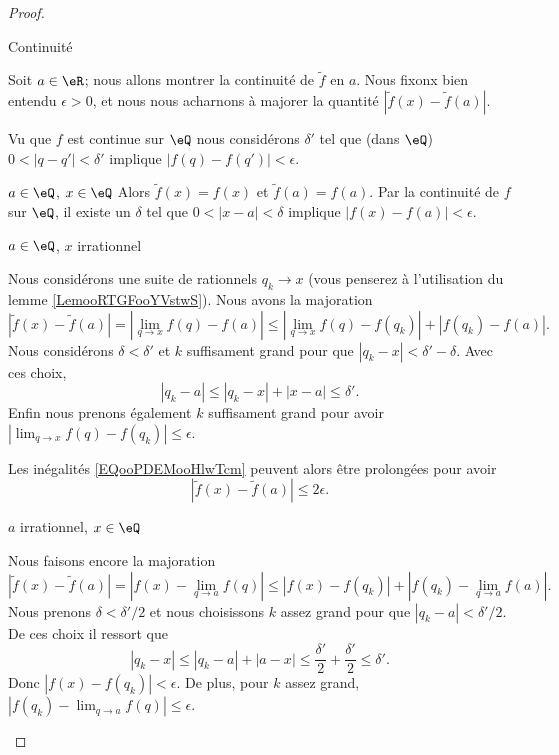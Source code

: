 \begin{proof}
\begin{subproof}
		\item[Continuité]

		Soit \( a\in \eR\); nous allons montrer la continuité de \( \tilde f\) en \( a\). Nous fixonx bien entendu \( \epsilon>0\), et nous nous acharnons à majorer la quantité \( | \tilde f(x)-\tilde f(a) |\).

		Vu que \( f\) est continue sur \( \eQ\) nous considérons \( \delta'\) tel que (dans \( \eQ\)) \( 0<| q-q' |<\delta'\) implique \( | f(q)-f(q') |<\epsilon\).

		\begin{subproof}
			\item[\( a\in \eQ\), \( x\in \eQ\)]
			Alors \( \tilde f(x)=f(x)\) et \( \tilde f(a)=f(a)\). Par la continuité de \( f\) sur \( \eQ\), il existe un \( \delta\) tel que \( 0<| x-a |<\delta\) implique \( | f(x)-f(a) |<\epsilon\).

			\item[\( a\in \eQ\), \( x\) irrationnel]

			Nous considérons une suite de rationnels \( q_k\to x\) (vous penserez à l'utilisation du lemme \ref{LemooRTGFooYVstwS}). Nous avons la majoration
			\begin{equation}        \label{EQooPDEMooHlwTcm}
				| \tilde f(x)-\tilde f(a) |=| \lim_{q\to x} f(q)-f(a) |\leq | \lim_{q\to x} f(q)-f(q_k) |+| f(q_k)-f(a) |.
			\end{equation}
			Nous considérons \( \delta<\delta'\) et \( k\) suffisament grand pour que \( | q_k-x |<\delta'-\delta\). Avec ces choix,
			\begin{equation}
				| q_k-a |\leq | q_k-x |+| x-a |\leq \delta'.
			\end{equation}
			Enfin nous prenons également \( k\) suffisament grand pour avoir \( | \lim_{q\to x} f(q)-f(q_k) |\leq \epsilon\).

			Les inégalités \eqref{EQooPDEMooHlwTcm} peuvent alors être prolongées pour avoir
			\begin{equation}
				| \tilde f(x)-\tilde f(a) |\leq 2\epsilon.
			\end{equation}

			\item[\( a\) irrationnel, \( x\in \eQ\)]

			Nous faisons encore la majoration
			\begin{equation}
				| \tilde f(x)-\tilde f(a) |=| f(x)-\lim_{q\to a} f(q) |\leq | f(x)-f(q_k) |+| f(q_k)-\lim_{q\to a} f(a) |.
			\end{equation}
			Nous prenons \( \delta<\delta'/2\) et nous choisissons \( k\) assez grand pour que \( | q_k-a |<\delta'/2\). De ces choix il ressort que
			\begin{equation}
				| q_k-x |\leq | q_k-a |+| a-x |\leq \frac{ \delta' }{2}+\frac{ \delta' }{2}\leq \delta'.
			\end{equation}
			Donc \( | f(x)-f(q_k) |<\epsilon\). De plus, pour \( k\) assez grand, \( | f(q_k)-\lim_{q\to a} f(q) |\leq \epsilon\).


\end{subproof}
\end{subproof}
\end{proof}
